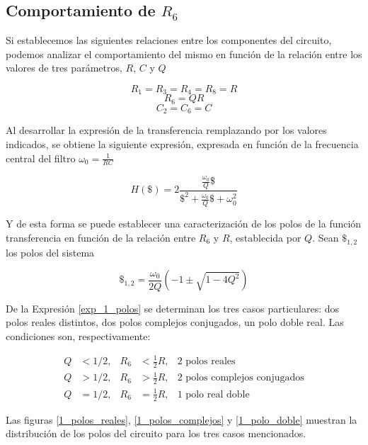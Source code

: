\subsection{Comportamiento de $R_6$}\label{1_seccion_r6}

Si establecemos las siguientes relaciones entre los componentes del circuito, podemos analizar el comportamiento del mismo en función de la relación entre los valores de tres parámetros, $R$, $C$ y $Q$


\[R_1=R_3=R_4=R_8 = R \]
\[R_6 = QR\] 
\[C_2=C_6=C\]

Al desarrollar la expresión de la transferencia remplazando por los valores indicados, se obtiene la siguiente expresión, expresada en función de la frecuencia central del filtro $\omega_0 = \frac{1}{RC}$

\[
H(\$) = 2 \frac{\frac{\omega_0}{Q}\$}{\$^2 + \frac{\omega_0}{Q}\$ + \omega_0^2}
\]

Y de esta forma se puede establecer una caracterización de los polos de la función transferencia en función de la relación entre $R_6$ y $R$, establecida por $Q$. Sean $\$_{1,2}$ los polos del sistema

\begin{equation}
\$_{1,2} = \frac{\omega_0}{2Q}\left(-1 \pm \sqrt{1-4Q^2}\right)
\label{exp_1_polos}
\end{equation}

De la Expresión \ref{exp_1_polos} se determinan los tres casos particulares: dos polos reales distintos, dos polos complejos conjugados, un polo doble real. Las condiciones son, respectivamente:

\begin{subequations}
\begin{align*}
  Q &< 1/2, & R_6 &< \frac{1}{2} R, &\text{2 polos reales} \\
  Q &> 1/2, & R_6 &> \frac{1}{2} R, &\text{2 polos complejos conjugados} \\
  Q &= 1/2, & R_6 &= \frac{1}{2} R, &\text{1 polo real doble}
\end{align*}
\end{subequations}

Las figuras \ref{1_polos_reales}, \ref{1_polos_complejos} y \ref{1_polo_doble} muestran la distribución de los polos del circuito para los tres casos mencionados.


